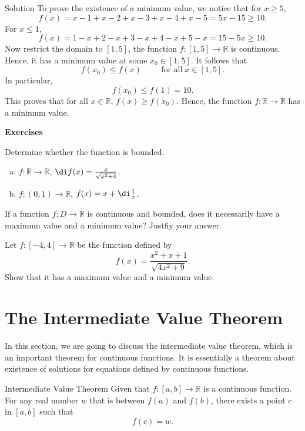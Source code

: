 \begin{example}
\begin{solution}{Solution}
 To prove the existence of a minimum value,  we notice that for $x\geq 5$,
  \[f(x)=x-1+x-2+x-3+x-4+x-5=5x-15\geq  10.\]
  For $x\leq 1$,  
  \[f(x)=1-x+2-x+3-x+4-x+5-x=15-5x\geq 10.\]
  Now restrict the domain to $[1,5]$, the function $f:[1,5]\rightarrow\mathbb{R}$ is continuous. Hence, it has a minimum value at some $x_0\in [1,5]$. It follows that
  \[f(x_0)\leq f(x)\hspace{1cm}\text{for all}\;x\in [1,5].\]
  In particular,
  \[f(x_0)\leq f(1)=10.\] 
  This proves that for all $x\in\mathbb{R}$, 
$f(x)\geq f(x_0)$.
  Hence, the function $f:\mathbb{R}\rightarrow\mathbb{R}$ has a minimum value.
  \end{solution}
  
\vp
\noindent
{\bf \large Exercises  \thesection}
\setcounter{myquestion}{1}
 \begin{question}{\themyquestion}
 Determine whether the function is bounded.
 \begin{enumerate}[(a)]
 \item $f:\mathbb{R}\rightarrow\mathbb{R}$, $\di f(x)=\frac{x}{\sqrt{x^2+4}}$.
 \item $f:(0,1)\rightarrow\mathbb{R}$, $f(x)=x+\di\frac{1}{x}$.
 \end{enumerate}
\end{question}
\atc
 \begin{question}{\themyquestion}
 If a function $f:D\rightarrow\mathbb{R}$ is continuous and bounded, does it necessarily have a maximum value and a minimum value? Justfiy your answer.
\end{question}
\atc
 \begin{question}{\themyquestion}
 Let $f:[-4,4]\rightarrow\mathbb{R}$ be the function defined by 
 \[f(x)=\frac{x^2+x+1}{\sqrt{4x^2+9}}.\]Show that it has a maximum value and a minimum value.
\end{question}
\vp

\section{The Intermediate Value Theorem}\label{sec2.4}


In this section, we are going to discuss  the intermediate value theorem, which is an  important theorem for continuous functions. It is essentially a theorem about existence of solutions for equations defined by continuous functions. 

\begin{theorem}{Intermediate Value Theorem}
Given that $f:[a,b]\rightarrow \mathbb{R}$ is a continuous function. For any real number $w$ that is between $f(a)$ and $f(b)$, there exists a point $c$ in $[a, b]$ such that
\[f(c)=w.\]


\end{theorem}
\end{example}
